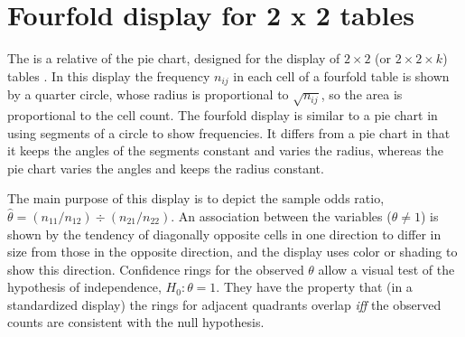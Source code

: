\section{Fourfold display for 2 x 2 tables}\label{sec:twoway-fourfold}
The  is a relative of the pie chart,
designed for the display of $2 \times 2$ (or $2 \times 2 \times k$)
tables
\citep{Fienberg:75,Friendly:94b,Friendly:94c}.
In this display the frequency
\(n_{ij}\) in each cell of a fourfold table is shown by a quarter
circle, whose radius is proportional to \(\sqrt { n_{ij} }\), so the
area is proportional to the cell count.
The fourfold display
is similar to a pie chart in using segments of
a circle to show frequencies.  It
differs from a pie chart in that it keeps the
angles of the segments constant and varies the radius,
whereas the pie chart varies the angles and keeps the radius constant.

The main purpose of this display is to depict the sample odds ratio,
\(\hat{\theta} = (n_{11} /  n_{12} )
\div  (n_{21} /  n_{22} )\).  An association between the variables
(\(\theta \neq 1\)) is shown by the tendency of diagonally opposite
cells in one direction to differ in size from those in the opposite
direction, and the display uses color or shading to show this
direction.  Confidence rings for the observed \(\theta\) allow a
visual test of the hypothesis of independence,
 \(H_0 :  \theta  =  1\).  They have
the property that (in a standardized display) the rings for adjacent quadrants overlap \emph{iff}
the observed counts are consistent with the null hypothesis.

